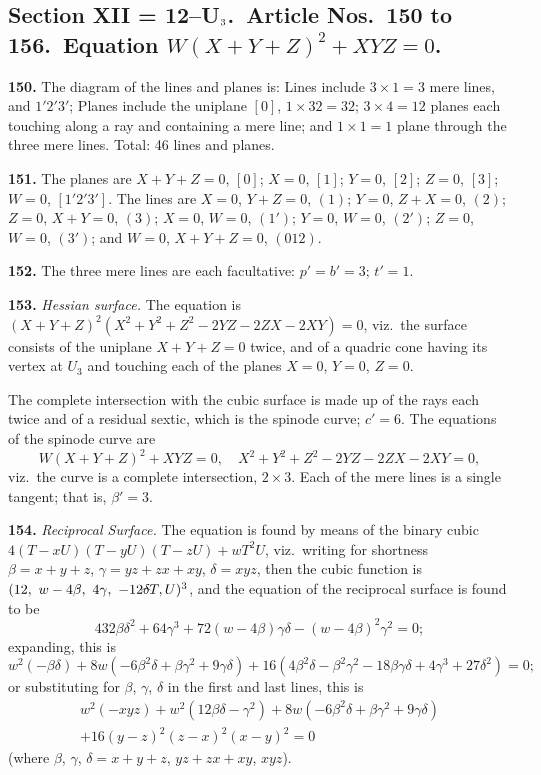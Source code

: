 \documentclass[11pt,a4paper]{article}
\theoremstyle{definition}
\begin{document}
\subsection*{Section XII = 12--U$_{\mbox{\scriptsize 3}}$.\ Article Nos.\ 150 to 156.\ Equation $W(X+Y+Z)^2+XYZ=0$.}

\noindent\textbf{150.} The diagram of the lines and planes is: Lines include $3\times 1=3$ mere lines, and $1'2'3'$; Planes include the uniplane $[0]$, $1\times 32=32$; $3\times 4=12$ planes each touching along a ray and containing a mere line; and $1\times 1=1$ plane through the three mere lines. Total: 46 lines and planes.

\noindent\textbf{151.} The planes are $X+Y+Z=0$, $[0]$; $X=0$, $[1]$; $Y=0$, $[2]$; $Z=0$, $[3]$; $W=0$, $[1'2'3']$. The lines are $X=0$, $Y+Z=0$, $(1)$; $Y=0$, $Z+X=0$, $(2)$; $Z=0$, $X+Y=0$, $(3)$; $X=0$, $W=0$, $(1')$; $Y=0$, $W=0$, $(2')$; $Z=0$, $W=0$, $(3')$; and $W=0$, $X+Y+Z=0$, $(012)$.

\noindent\textbf{152.} The three mere lines are each facultative: $p'=b'=3$; $t'=1$.

\noindent\textbf{153.} \textit{Hessian surface.} The equation is $(X+Y+Z)^2(X^2+Y^2+Z^2-2YZ-2ZX-2XY)=0$, viz.\ the surface consists of the uniplane $X+Y+Z=0$ twice, and of a quadric cone having its vertex at $U_3$ and touching each of the planes $X=0$, $Y=0$, $Z=0$.

The complete intersection with the cubic surface is made up of the rays each twice and of a residual sextic, which is the spinode curve; $c'=6$. The equations of the spinode curve are
\[
W(X+Y+Z)^2+XYZ=0, \quad X^2+Y^2+Z^2-2YZ-2ZX-2XY=0,
\]
viz.\ the curve is a complete intersection, $2\times 3$. Each of the mere lines is a single tangent; that is, $\beta'=3$.

\setcounter{page}{432}

\noindent\textbf{154.} \textit{Reciprocal Surface.} The equation is found by means of the binary cubic $4(T-xU)(T-yU)(T-zU)+wT^2U$, viz.\ writing for shortness $\beta=x+y+z$, $\gamma=yz+zx+xy$, $\delta=xyz$, then the cubic function is $(12,\ w-4\beta,\ 4\gamma,\ -12\delta\!\hbox{\hspace{-0.5em}}\raisebox{0.3ex}{$\scriptstyle\frown$}\!T,U)^3$, and the equation of the reciprocal surface is found to be
\[
432\beta\delta^2 + 64\gamma^3 + 72(w-4\beta)\gamma\delta - (w-4\beta)^2\gamma^2=0;
\]
expanding, this is
\[
w^2(-\beta\delta) + 8w(-6\beta^2\delta+\beta\gamma^2+9\gamma\delta) + 16(4\beta^2\delta-\beta^2\gamma^2-18\beta\gamma\delta+4\gamma^3+27\delta^2)=0;
\]
or substituting for $\beta$, $\gamma$, $\delta$ in the first and last lines, this is
\begin{multline*}
w^2(-xyz) + w^2(12\beta\delta-\gamma^2) + 8w(-6\beta^2\delta+\beta\gamma^2+9\gamma\delta) \\
+ 16(y-z)^2(z-x)^2(x-y)^2=0
\end{multline*}
(where $\beta$, $\gamma$, $\delta=x+y+z$, $yz+zx+xy$, $xyz$).
\end{document}
